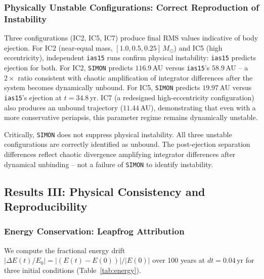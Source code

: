 \documentclass[12pt,a4paper]{article}
\newcommand{\simon}{\texttt{SIMON}}
\newcommand{\ias}{\texttt{ias15}}
\begin{document}
\subsubsection{Physically Unstable Configurations: Correct Reproduction of Instability}

Three configurations (IC2, IC5, IC7) produce final RMS values indicative of body ejection. For IC2 (near-equal mass, $[1.0, 0.5, 0.25]\,M_\odot$) and IC5 (high eccentricity), independent \ias{} runs confirm physical instability: \ias{} predicts ejection for both. For IC2, \simon{} predicts $116.9$\,AU versus \ias{}'s $58.9$\,AU -- a $2\times$ ratio consistent with chaotic amplification of integrator differences after the system becomes dynamically unbound. For IC5, \simon{} predicts $19.97$\,AU versus \ias{}'s ejection at $t=34.8$\,yr. IC7 (a redesigned high-eccentricity configuration) also produces an unbound trajectory ($11.44$\,AU), demonstrating that even with a more conservative periapsis, this parameter regime remains dynamically unstable.

Critically, \simon{} does not suppress physical instability. All three unstable configurations are correctly identified as unbound. The post-ejection separation differences reflect chaotic divergence amplifying integrator differences after dynamical unbinding -- not a failure of \simon{} to identify instability.

\subsection{Results III: Physical Consistency and Reproducibility}
\label{sec:results_phys}

\subsubsection{Energy Conservation: Leapfrog Attribution}
\label{sec:energy}

We compute the fractional energy drift $|\Delta E(t)/E_0| = |(E(t) - E(0))|/|E(0)|$ over 100 years at $dt=0.04$\,yr for three initial conditions (Table~\ref{tab:energy}).
\end{document}
